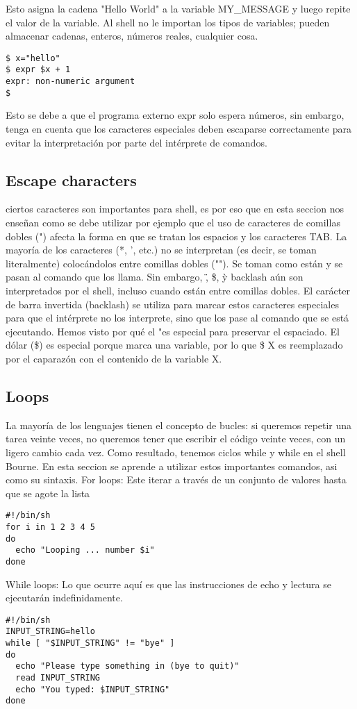 \documentclass{article}
\begin{document}
Esto asigna la cadena "Hello World" a la variable MY\_MESSAGE y luego repite el valor de la variable.
Al shell no le importan los tipos de variables; pueden almacenar cadenas, enteros, números reales, cualquier cosa.

\begin{verbatim}
$ x="hello"
$ expr $x + 1
expr: non-numeric argument
$
\end{verbatim}

Esto se debe a que el programa externo expr solo espera números, sin embargo, tenga en cuenta que los caracteres especiales deben escaparse correctamente para evitar la interpretación por parte del intérprete de comandos.

\subsection{Escape characters}
ciertos caracteres son importantes para shell, es por eso que en esta seccion nos enseñan como se debe utilizar por ejemplo que el uso de caracteres de comillas dobles (") afecta la forma en que se tratan los espacios y los caracteres TAB.
La mayoría de los caracteres (*, ', etc.) no se interpretan (es decir, se toman literalmente) colocándolos entre comillas dobles (""). Se toman como están y se pasan al comando que los llama.
Sin embargo, \", \$, \` y backlash aún son interpretados por el shell, incluso cuando están entre comillas dobles.
El carácter de barra invertida (backlash) se utiliza para marcar estos caracteres especiales para que el intérprete no los interprete, sino que los pase al comando que se está ejecutando.
Hemos visto por qué el "es especial para preservar el espaciado. El dólar (\$) es especial porque marca una variable, por lo que \$ X es reemplazado por el caparazón con el contenido de la variable X.


\subsection{Loops}
La mayoría de los lenguajes tienen el concepto de bucles: si queremos repetir una tarea veinte veces, no queremos tener que escribir el código veinte veces, con un ligero cambio cada vez.
Como resultado, tenemos ciclos while y while en el shell Bourne.
En esta seccion se aprende a utilizar estos importantes comandos, asi como su sintaxis.
\newline
For loops:
\newline
Este iterar a través de un conjunto de valores hasta que se agote la lista
\begin{verbatim}
#!/bin/sh
for i in 1 2 3 4 5
do
  echo "Looping ... number $i"
done
\end{verbatim}
While loops:
\newline
Lo que ocurre aquí es que las instrucciones de echo y lectura se ejecutarán indefinidamente.
\begin{verbatim}
#!/bin/sh
INPUT_STRING=hello
while [ "$INPUT_STRING" != "bye" ]
do
  echo "Please type something in (bye to quit)"
  read INPUT_STRING
  echo "You typed: $INPUT_STRING"
done
\end{verbatim}
\end{document}
